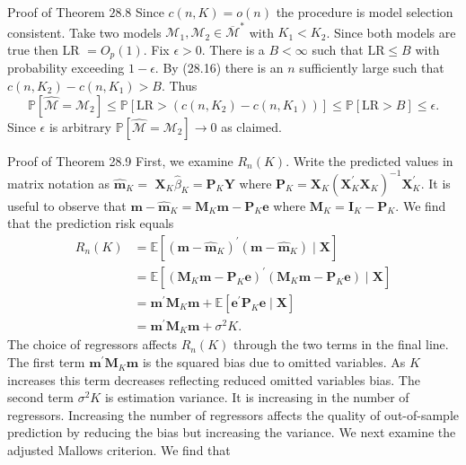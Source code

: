 \documentclass[10pt]{article}
\begin{document}
Proof of Theorem $28.8$ Since $c(n, K)=o(n)$ the procedure is model selection consistent. Take two models $\mathscr{M}_{1}, \mathscr{M}_{2} \in \overline{\mathscr{M}}^{*}$ with $K_{1}<K_{2}$. Since both models are true then LR $=O_{p}(1)$. Fix $\epsilon>0$. There is a $B<\infty$ such that $\mathrm{LR} \leq B$ with probability exceeding $1-\epsilon$. By (28.16) there is an $n$ sufficiently large such that $c\left(n, K_{2}\right)-c\left(n, K_{1}\right)>B$. Thus
$$
\mathbb{P}\left[\widehat{\mathscr{M}}=\mathscr{M}_{2}\right] \leq \mathbb{P}\left[\mathrm{LR}>\left(c\left(n, K_{2}\right)-c\left(n, K_{1}\right)\right)\right] \leq \mathbb{P}[\mathrm{LR}>B] \leq \epsilon .
$$
Since $\epsilon$ is arbitrary $\mathbb{P}\left[\widehat{\mathscr{M}}=\mathscr{M}_{2}\right] \longrightarrow 0$ as claimed.

Proof of Theorem 28.9 First, we examine $R_{n}(K)$. Write the predicted values in matrix notation as $\widehat{\boldsymbol{m}}_{K}=$ $\boldsymbol{X}_{K} \widehat{\beta}_{K}=\boldsymbol{P}_{K} \boldsymbol{Y}$ where $\boldsymbol{P}_{K}=\boldsymbol{X}_{K}\left(\boldsymbol{X}_{K}^{\prime} \boldsymbol{X}_{K}\right)^{-1} \boldsymbol{X}_{K}^{\prime}$. It is useful to observe that $\boldsymbol{m}-\widehat{\boldsymbol{m}}_{K}=\boldsymbol{M}_{K} \boldsymbol{m}-\boldsymbol{P}_{K} \boldsymbol{e}$ where $\boldsymbol{M}_{K}=\boldsymbol{I}_{K}-\boldsymbol{P}_{K}$. We find that the prediction risk equals
$$
\begin{aligned}
R_{n}(K) &=\mathbb{E}\left[\left(\boldsymbol{m}-\widehat{\boldsymbol{m}}_{K}\right)^{\prime}\left(\boldsymbol{m}-\widehat{\boldsymbol{m}}_{K}\right) \mid \boldsymbol{X}\right] \\
&=\mathbb{E}\left[\left(\boldsymbol{M}_{K} \boldsymbol{m}-\boldsymbol{P}_{K} \boldsymbol{e}\right)^{\prime}\left(\boldsymbol{M}_{K} \boldsymbol{m}-\boldsymbol{P}_{K} \boldsymbol{e}\right) \mid \boldsymbol{X}\right] \\
&=\boldsymbol{m}^{\prime} \boldsymbol{M}_{K} \boldsymbol{m}+\mathbb{E}\left[\boldsymbol{e}^{\prime} \boldsymbol{P}_{K} \boldsymbol{e} \mid \boldsymbol{X}\right] \\
&=\boldsymbol{m}^{\prime} \boldsymbol{M}_{K} \boldsymbol{m}+\sigma^{2} K .
\end{aligned}
$$
The choice of regressors affects $R_{n}(K)$ through the two terms in the final line. The first term $\boldsymbol{m}^{\prime} \boldsymbol{M}_{K} \boldsymbol{m}$ is the squared bias due to omitted variables. As $K$ increases this term decreases reflecting reduced omitted variables bias. The second term $\sigma^{2} K$ is estimation variance. It is increasing in the number of regressors. Increasing the number of regressors affects the quality of out-of-sample prediction by reducing the bias but increasing the variance. We next examine the adjusted Mallows criterion. We find that
\end{document}
